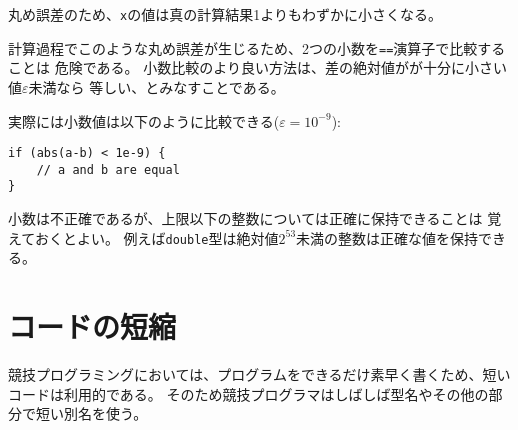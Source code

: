 丸め誤差のため、\texttt{x}の値は真の計算結果1よりもわずかに小さくなる。

計算過程でこのような丸め誤差が生じるため、2つの小数を\texttt{==}演算子で比較することは
危険である。
小数比較のより良い方法は、差の絶対値がが十分に小さい値$\varepsilon$未満なら
等しい、とみなすことである。

\begin{comment}
In practice, the numbers can be compared
as follows ($\varepsilon=10^{-9}$):
\end{comment}

実際には小数値は以下のように比較できる($\varepsilon=10^{-9}$):

\begin{lstlisting}
if (abs(a-b) < 1e-9) {
    // a and b are equal
}
\end{lstlisting}

\begin{comment}
Note that while floating point numbers are inaccurate,
integers up to a certain limit can still be
represented accurately.
For example, using \texttt{double},
it is possible to accurately represent all
integers whose absolute value is at most $2^{53}$.
\end{comment}

小数は不正確であるが、上限以下の整数については正確に保持できることは
覚えておくとよい。
例えば\texttt{double}型は絶対値$2^{53}$未満の整数は正確な値を保持できる。

\begin{comment}
\section{Shortening code}

Short code is ideal in competitive programming,
because programs should be written
as fast as possible.
Because of this, competitive programmers often define
shorter names for datatypes and other parts of code.
\end{comment}

\section{コードの短縮}

競技プログラミングにおいては、プログラムをできるだけ素早く書くため、短いコードは利用的である。
そのため競技プログラマはしばしば型名やその他の部分で短い別名を使う。


